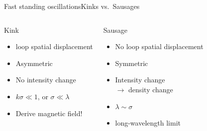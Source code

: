 \documentclass[table]{beamer}
\begin{document}
\begin{frame}{Fast standing oscillations}{Kinks vs.\ Sausages}
    \begin{columns}
    \begin{block}{Kink}
        \begin{itemize}
            \item loop spatial displacement
            \item Asymmetric
            \item No intensity change
            \item $k\sigma \ll 1$, or $\sigma\ll\lambda$
            \item \textcolor{arylyellow}{Derive magnetic field!}
        \end{itemize}
    \end{block}
    \begin{block}{Sausage}
        \begin{itemize}
            \item No loop spatial displacement
            \item Symmetric
            \item Intensity change\\ $\rightarrow$ density change
            \item $\lambda\sim\sigma$
            \item long-wavelength limit
        \end{itemize}
    \end{block}
\end{columns}
\end{frame}%
\end{document}
